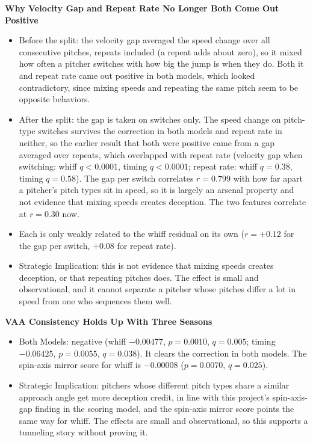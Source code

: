 \documentclass[11pt]{article}
\newcommand{\feat}[1]{\textbf{#1}}
\begin{document}
\feat{Why Velocity Gap and Repeat Rate No Longer Both Come Out Positive}
\begin{itemize}
\item Before the split: the velocity gap averaged the speed change over all consecutive pitches, repeats included (a repeat adds about zero), so it mixed how often a pitcher switches with how big the jump is when they do. Both it and repeat rate came out positive in both models, which looked contradictory, since mixing speeds and repeating the same pitch seem to be opposite behaviors.
\item After the split: the gap is taken on switches only. The speed change on pitch-type switches survives the correction in both models and repeat rate in neither, so the earlier result that both were positive came from a gap averaged over repeats, which overlapped with repeat rate (velocity gap when switching: whiff $q<0.0001$, timing $q<0.0001$; repeat rate: whiff $q=0.38$, timing $q=0.58$). The gap per switch correlates $r=0.799$ with how far apart a pitcher's pitch types sit in speed, so it is largely an arsenal property and not evidence that mixing speeds creates deception. The two features correlate at $r=0.30$ now.
\item Each is only weakly related to the whiff residual on its own ($r=+0.12$ for the gap per switch, $+0.08$ for repeat rate).
\item Strategic Implication: this is not evidence that mixing speeds creates deception, or that repeating pitches does. The effect is small and observational, and it cannot separate a pitcher whose pitches differ a lot in speed from one who sequences them well.
\end{itemize}

\feat{VAA Consistency Holds Up With Three Seasons}
\begin{itemize}
\item Both Models: negative (whiff $-0.00477$, $p=0.0010$, $q=0.005$; timing $-0.06425$, $p=0.0055$, $q=0.038$). It clears the correction in both models. The spin-axis mirror score for whiff is $-0.00008$ ($p=0.0070$, $q=0.025$).
\item Strategic Implication: pitchers whose different pitch types share a similar approach angle get more deception credit, in line with this project's spin-axis-gap finding in the scoring model, and the spin-axis mirror score points the same way for whiff. The effects are small and observational, so this supports a tunneling story without proving it.
\end{itemize}
\end{document}
